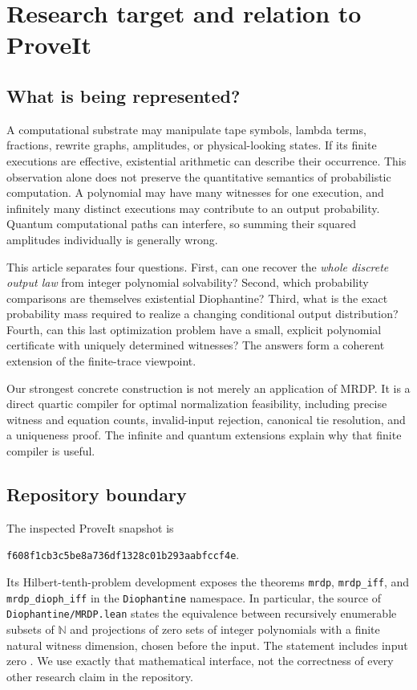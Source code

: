 \documentclass[11pt,letterpaper]{article}
\numberwithin{equation}{section}
\theoremstyle{definition}
\theoremstyle{remark}
\newcommand{\N}{\mathbb N}
\newcommand{\code}[1]{\nolinkurl{#1}}
\newcommand{\snapshot}{\texttt{f608f1cb3c5be8a736df1328c01b293aabfccf4e}}
\begin{document}
\section{Research target and relation to ProveIt}\label{pqc:sec:context}

\subsection{What is being represented?}
A computational substrate may manipulate tape symbols, lambda terms,
fractions, rewrite graphs, amplitudes, or physical-looking states. If its
finite executions are effective, existential arithmetic can describe their
occurrence. This observation alone does not preserve the quantitative
semantics of probabilistic computation. A polynomial may have many witnesses
for one execution, and infinitely many distinct executions may contribute
to an output probability. Quantum computational paths can interfere, so
summing their squared amplitudes individually is generally wrong.

This article separates four questions. First, can one recover the \emph{whole
discrete output law} from integer polynomial solvability? Second, which
probability comparisons are themselves existential Diophantine? Third, what
is the exact probability mass required to realize a changing conditional
output distribution? Fourth, can this last optimization problem have a
small, explicit polynomial certificate with uniquely determined witnesses?
The answers form a coherent extension of the finite-trace viewpoint.

Our strongest concrete construction is not merely an application of MRDP.
It is a direct quartic compiler for optimal normalization feasibility,
including precise witness and equation counts, invalid-input rejection,
canonical tie resolution, and a uniqueness proof. The infinite and quantum
extensions explain why that finite compiler is useful.

\subsection{Repository boundary}
The inspected ProveIt snapshot is
\begin{center}\small\snapshot.\end{center}
Its Hilbert-tenth-problem development exposes the theorems
\code{mrdp}, \code{mrdp_iff}, and \code{mrdp_dioph_iff}
in the \code{Diophantine} namespace. In particular, the source of
\code{Diophantine/MRDP.lean} states the equivalence between recursively
enumerable subsets of $\N$ and projections of zero sets of integer
polynomials with a finite natural witness dimension, chosen before the
input. The statement includes input zero \cite{proveit-mrdp,proveit-readme}.
We use exactly that mathematical interface, not the correctness of every
other research claim in the repository.
\end{document}
